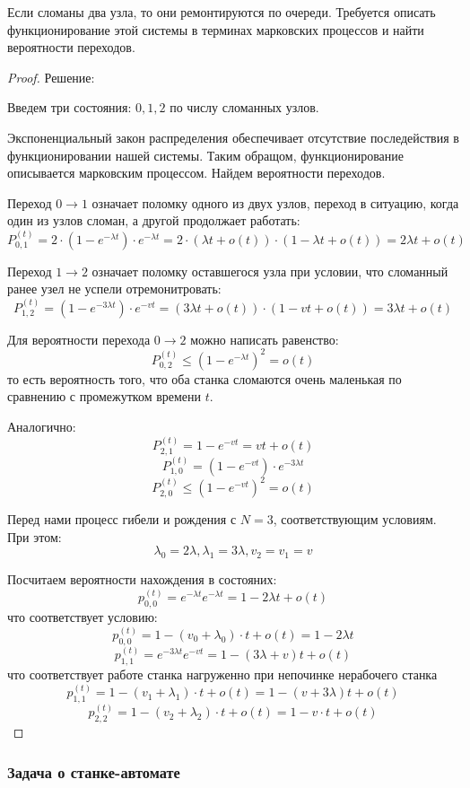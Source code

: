 \documentclass[aps,%
12pt,%
final,%
oneside,
onecolumn,%
musixtex, %
superscriptaddress,%
centertags]{article} %
\theoremstyle{plain}
\theoremstyle{definition}
\theoremstyle{remark}
\begin{document}
Если сломаны два узла, то они ремонтируются по очереди. Требуется описать функционирование этой системы в терминах марковских процессов и найти вероятности переходов.
\begin{proof}
	Решение:

	Введем три состояния: $0,1,2$ по числу сломанных узлов.

	Экспоненциальный закон распределения обеспечивает отсутствие последействия в функционировании нашей системы. Таким обращом, функционирование описывается марковским процессом. Найдем вероятности переходов.

	Переход $0 \to 1$ означает поломку одного из двух узлов, переход в ситуацию, когда один из узлов сломан, а другой продолжает работать:
	$$P_{0,1}^{(t)} = 2 \cdot (1-e^{-\lambda t}) \cdot e^{-\lambda t} = 2 \cdot (\lambda t + o(t)) \cdot (1-\lambda t + o(t)) = 2\lambda t + o(t)$$

	Переход $1 \to 2$ означает поломку оставшегося узла при условии, что сломанный ранее узел не успели отремонитровать:
	$$P_{1,2}^(t) = (1-e^{-3\lambda t}) \cdot  e^{-v t} = (3\lambda t + o(t)) \cdot (1-vt +o(t)) = 3\lambda t + o(t)$$

	Для вероятности перехода $0 \to 2$ можно написать равенство:
	$$P_{0,2}^{(t)} \leq (1-e^{-\lambda t})^2 = o(t)$$
	то есть вероятность того, что оба станка сломаются очень маленькая по сравнению с промежутком времени $t$.

	Аналогично:
	$$P_{2,1}^{(t)} = 1-e^{-vt} = vt +o(t)$$
	$$P_{1,0}^{(t)} = (1-e^{-vt}) \cdot  e^{-3\lambda t}$$
	$$P_{2,0}^{(t)} \leq (1-e^{-vt})^2 = o(t)$$

	Перед нами процесс гибели и рождения с $N=3$, соответствующим условиям. При этом:
	$$\lambda_0 = 2\lambda, \lambda_1 = 3\lambda, v_2 = v_1 = v$$

	Посчитаем вероятности нахождения в состояних:
	$$p_{0,0}^{(t)} = e^{-\lambda t}e^{-\lambda t} = 1 - 2\lambda t + o(t)$$
	что соответствует условию:
	$$p_{0,0}^{(t)} = 1 - (v_0 + \lambda_0) \cdot  t + o(t) = 1 -2\lambda t $$
	$$p_{1,1}^{(t)} = e^{-3\lambda t}e^{-v t} = 1 -(3\lambda +v)t + o(t)$$
	что соответствует работе станка нагруженно при непочинке нерабочего станка
	$$p_{1,1}^{(t)} = 1 - (v_1 + \lambda_1) \cdot  t + o(t) = 1 -(v + 3\lambda) t +o(t)$$
	$$p_{2,2}^{(t)} = 1 - (v_2 + \lambda_2) \cdot  t + o(t) = 1 - v\cdot  t +o(t)$$
	
\end{proof}

\subsubsection{Задача о станке-автомате}
\end{document}
